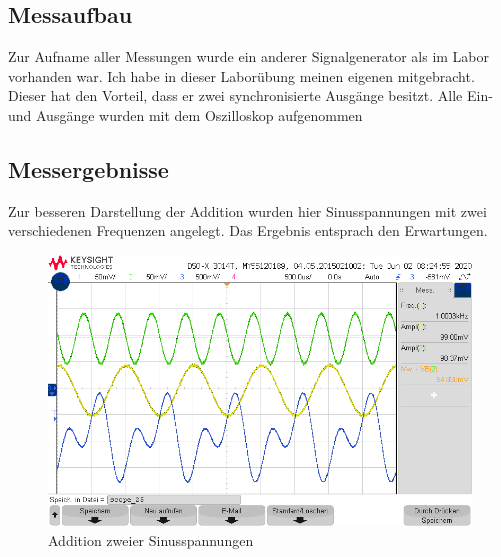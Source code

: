 \subsection{Messaufbau}
Zur Aufname aller Messungen wurde ein anderer Signalgenerator als im Labor vorhanden war. Ich habe in dieser Laborübung meinen eigenen mitgebracht. Dieser hat den Vorteil, dass er zwei synchronisierte Ausgänge besitzt. Alle Ein- und Ausgänge wurden mit dem Oszilloskop aufgenommen


\subsection{Messergebnisse}
Zur besseren Darstellung der Addition wurden hier Sinusspannungen mit zwei verschiedenen Frequenzen angelegt. Das Ergebnis entsprach den Erwartungen. 
\begin{figure}[H]
    \centering
    \includegraphics[width=\costumPicWidth]{Lab_1/Messungen/Addierer/scope_25.png}
    \caption{Addition zweier Sinusspannungen}
    \label{fig:Addierschaltung_Ergebnis}
\end{figure}

